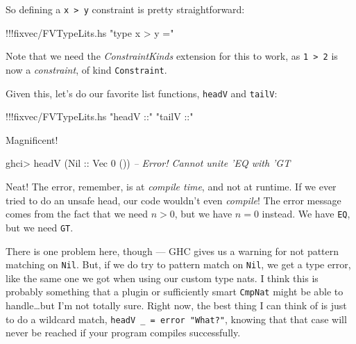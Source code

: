 \documentclass[]{article}
\newenvironment{Shaded}{}{}
\newcommand{\DataTypeTok}[1]{\textcolor[rgb]{0.56,0.13,0.00}{{#1}}}
\newcommand{\DecValTok}[1]{\textcolor[rgb]{0.25,0.63,0.44}{{#1}}}
\newcommand{\StringTok}[1]{\textcolor[rgb]{0.25,0.44,0.63}{{#1}}}
\newcommand{\CommentTok}[1]{\textcolor[rgb]{0.38,0.63,0.69}{\textit{{#1}}}}
\newcommand{\OtherTok}[1]{\textcolor[rgb]{0.00,0.44,0.13}{{#1}}}
\newcommand{\FunctionTok}[1]{\textcolor[rgb]{0.02,0.16,0.49}{{#1}}}
\newcommand{\NormalTok}[1]{{#1}}
\begin{document}
So defining a \texttt{x\ \textgreater{}\ y} constraint is pretty
straightforward:

\begin{Shaded}
\begin{Highlighting}[]
\FunctionTok{!!!}\NormalTok{fixvec}\FunctionTok{/}\NormalTok{FVTypeLits.hs }\StringTok{"type x > y ="}
\end{Highlighting}
\end{Shaded}

Note that we need the \emph{ConstraintKinds} extension for this to work,
as \texttt{1\ \textgreater{}\ 2} is now a \emph{constraint}, of kind
\texttt{Constraint}.

Given this, let's do our favorite list functions, \texttt{headV} and
\texttt{tailV}:

\begin{Shaded}
\begin{Highlighting}[]
\FunctionTok{!!!}\NormalTok{fixvec}\FunctionTok{/}\NormalTok{FVTypeLits.hs }\StringTok{"headV ::"} \StringTok{"tailV ::"}
\end{Highlighting}
\end{Shaded}

Magnificent!

\begin{Shaded}
\begin{Highlighting}[]
\NormalTok{ghci}\FunctionTok{>} \NormalTok{headV (}\DataTypeTok{Nil}\OtherTok{ ::} \DataTypeTok{Vec} \DecValTok{0} \NormalTok{())}
\CommentTok{-- Error!  Cannot unite 'EQ with 'GT}
\end{Highlighting}
\end{Shaded}

Neat! The error, remember, is at \emph{compile time}, and not at
runtime. If we ever tried to do an unsafe head, our code wouldn't even
\emph{compile}! The error message comes from the fact that we need
\(n > 0\), but we have \(n = 0\) instead. We have \texttt{EQ}, but we
need \texttt{GT}.

There is one problem here, though --- GHC gives us a warning for not
pattern matching on \texttt{Nil}. But, if we do try to pattern match on
\texttt{Nil}, we get a type error, like the same one we got when using
our custom type nats. I think this is probably something that a plugin
or sufficiently smart \texttt{CmpNat} might be able to handle\ldots{}but
I'm not totally sure. Right now, the best thing I can think of is just
to do a wildcard match, \texttt{headV\ \_\ =\ error\ "What?"}, knowing
that that case will never be reached if your program compiles
successfully.
\end{document}
